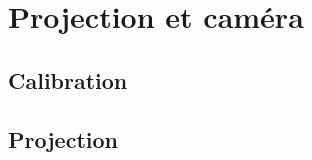     \section{Projection et caméra}

        \subsection{Calibration}
        
        \subsection{Projection}
